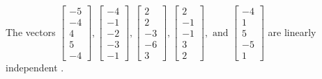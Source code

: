 \begin{exercise}
\begin{exerciseStatement}
  \end{exerciseStatement}
  \begin{exerciseAnswer}
   The vectors \(\left[\begin{array}{r}
-5 \\
-4 \\
4 \\
5 \\
-4
\end{array}\right] , \left[\begin{array}{r}
-4 \\
-1 \\
-2 \\
-3 \\
-1
\end{array}\right] , \left[\begin{array}{r}
2 \\
2 \\
-3 \\
-6 \\
3
\end{array}\right] , \left[\begin{array}{r}
2 \\
-1 \\
-1 \\
3 \\
2
\end{array}\right] , \text{ and } \left[\begin{array}{r}
-4 \\
1 \\
5 \\
-5 \\
1
\end{array}\right]\) are 
  	 linearly independent  .
  


  \end{exerciseAnswer}
\end{exercise}